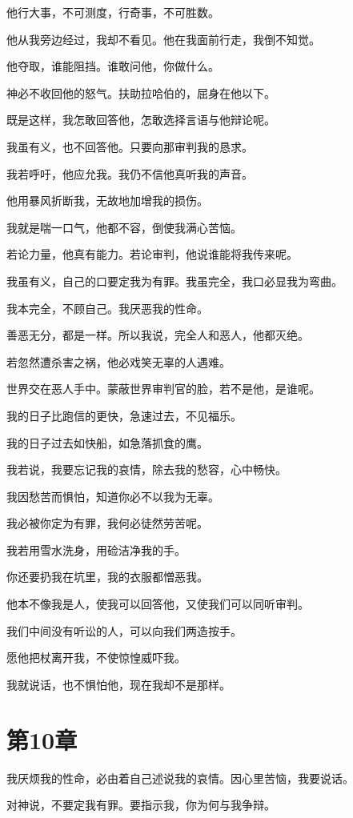\documentclass[12pt,oneside]{book}
\begin{document}
他行大事，不可测度，行奇事，不可胜数。

他从我旁边经过，我却不看见。他在我面前行走，我倒不知觉。

他夺取，谁能阻挡。谁敢问他，你做什么。

神必不收回他的怒气。扶助拉哈伯的，屈身在他以下。

既是这样，我怎敢回答他，怎敢选择言语与他辩论呢。

我虽有义，也不回答他。只要向那审判我的恳求。

我若呼吁，他应允我。我仍不信他真听我的声音。

他用暴风折断我，无故地加增我的损伤。

我就是喘一口气，他都不容，倒使我满心苦恼。

若论力量，他真有能力。若论审判，他说谁能将我传来呢。

我虽有义，自己的口要定我为有罪。我虽完全，我口必显我为弯曲。

我本完全，不顾自己。我厌恶我的性命。

善恶无分，都是一样。所以我说，完全人和恶人，他都灭绝。

若忽然遭杀害之祸，他必戏笑无辜的人遇难。

世界交在恶人手中。蒙蔽世界审判官的脸，若不是他，是谁呢。

我的日子比跑信的更快，急速过去，不见福乐。

我的日子过去如快船，如急落抓食的鹰。

我若说，我要忘记我的哀情，除去我的愁容，心中畅快。

我因愁苦而惧怕，知道你必不以我为无辜。

我必被你定为有罪，我何必徒然劳苦呢。

我若用雪水洗身，用硷洁净我的手。

你还要扔我在坑里，我的衣服都憎恶我。

他本不像我是人，使我可以回答他，又使我们可以同听审判。

我们中间没有听讼的人，可以向我们两造按手。

愿他把杖离开我，不使惊惶威吓我。

我就说话，也不惧怕他，现在我却不是那样。



\chapter{第10章}
我厌烦我的性命，必由着自己述说我的哀情。因心里苦恼，我要说话。

对神说，不要定我有罪。要指示我，你为何与我争辩。
\end{document}
